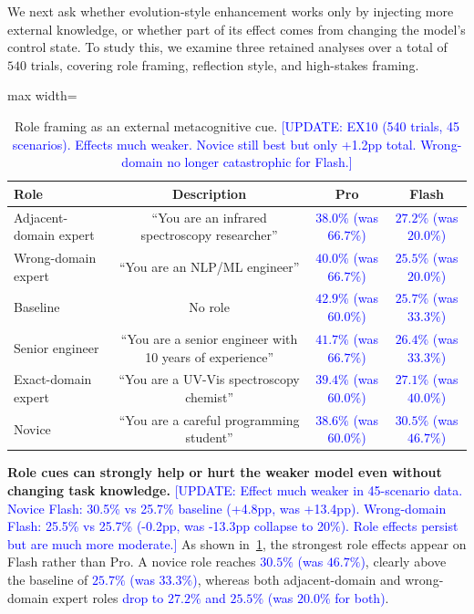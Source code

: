 \documentclass{article}
\newcommand{\blue}[1]{\textcolor{blue}{#1}}
\newcommand{\nbf}[1]{{\noindent \textbf{#1}}}
\begin{document}
We next ask whether evolution-style enhancement works only by injecting more external knowledge, or whether part of its effect comes from changing the model's control state. 
To study this, we examine three retained analyses over a total of $540$ trials, covering role framing, reflection style, and high-stakes framing. 

\begin{table}[h]
\centering
\caption{Role framing as an external metacognitive cue. \blue{[UPDATE: EX10 (540 trials, 45 scenarios). Effects much weaker. Novice still best but only +1.2pp total. Wrong-domain no longer catastrophic for Flash.]}}
\label{tab:role_framing}
\begin{adjustbox}{max width=\textwidth}
\begin{tabular}{lccc}
\toprule
\textbf{Role} & \textbf{Description} & \textbf{Pro} & \textbf{Flash} \\
\midrule
Adjacent-domain expert & ``You are an infrared spectroscopy researcher'' & \blue{$38.0\%$ (was $66.7\%$)} & \blue{$27.2\%$ (was $20.0\%$)} \\
Wrong-domain expert & ``You are an NLP/ML engineer'' & \blue{$40.0\%$ (was $66.7\%$)} & \blue{$25.5\%$ (was $20.0\%$)} \\
Baseline & No role & \blue{$42.9\%$ (was $60.0\%$)} & \blue{$25.7\%$ (was $33.3\%$)} \\
Senior engineer & ``You are a senior engineer with 10 years of experience'' & \blue{$41.7\%$ (was $66.7\%$)} & \blue{$26.4\%$ (was $33.3\%$)} \\
Exact-domain expert & ``You are a UV-Vis spectroscopy chemist'' & \blue{$39.4\%$ (was $60.0\%$)} & \blue{$27.1\%$ (was $40.0\%$)} \\
\cellcolor{bestRow}Novice & \cellcolor{bestRow}``You are a careful programming student'' & \cellcolor{bestRow}\blue{$38.6\%$ (was $60.0\%$)} & \cellcolor{bestRow}\blue{$30.5\%$ (was $46.7\%$)} \\
\bottomrule
\end{tabular}
\end{adjustbox}
\end{table}

\nbf{Role cues can strongly help or hurt the weaker model even without changing task knowledge.}
\blue{[UPDATE: Effect much weaker in 45-scenario data. Novice Flash: 30.5\% vs 25.7\% baseline (+4.8pp, was +13.4pp). Wrong-domain Flash: 25.5\% vs 25.7\% (-0.2pp, was -13.3pp collapse to 20\%). Role effects persist but are much more moderate.]}
As shown in~\cref{tab:role_framing}, the strongest role effects appear on Flash rather than Pro.
A novice role reaches \blue{$30.5\%$ (was $46.7\%$)}, clearly above the baseline of \blue{$25.7\%$ (was $33.3\%$)}, whereas both adjacent-domain and wrong-domain expert roles \blue{drop to $27.2\%$ and $25.5\%$ (was $20.0\%$ for both)}.
\end{document}
